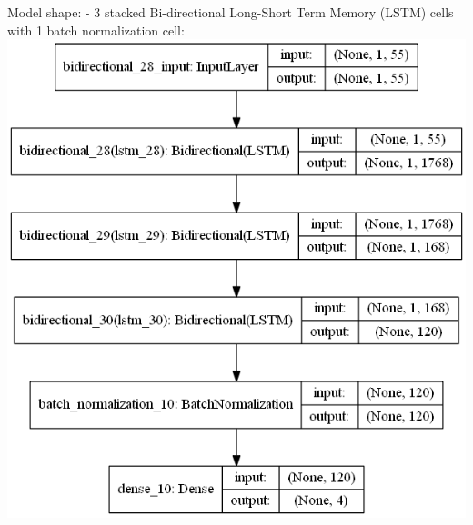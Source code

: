 \documentclass[11pt]{article}
\makeatletter
\def\maxwidth{\ifdim\Gin@nat@width>\linewidth\linewidth
    \else\Gin@nat@width\fi}
\let\Oldincludegraphics\includegraphics
\renewcommand{\includegraphics}[1]{\Oldincludegraphics[width=.8\maxwidth]{#1}}
\makeatother
\begin{document}
    Model shape: - 3 stacked Bi-directional Long-Short Term Memory (LSTM)
cells with 1 batch normalization cell:
\includegraphics{runs/2gpuPsoDe5agents40iters2islandsEvery10/foundModels/deModelIter13.png}
\end{document}
